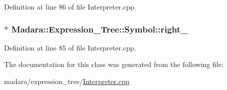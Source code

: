 Definition at line 86 of file Interpreter.cpp.

\hypertarget{classMadara_1_1Expression__Tree_1_1Symbol_a13467d1c78fbf06c3d64a6a4770eee7a}{
\subsubsection[{right\_\-}]{$\ast$ {\bf Madara::Expression\_\-Tree::Symbol::right\_\-}}}
\label{d5/d85/classMadara_1_1Expression__Tree_1_1Symbol_a13467d1c78fbf06c3d64a6a4770eee7a}


Definition at line 85 of file Interpreter.cpp.



The documentation for this class was generated from the following file:\begin{DoxyCompactItemize}
\item 
madara/expression\_\-tree/\hyperlink{Interpreter_8cpp}{Interpreter.cpp}\end{DoxyCompactItemize}
